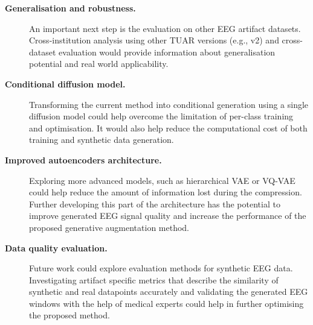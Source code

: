 \begin{description}

\item[\textbf{Generalisation and robustness.}] An important next step is the evaluation on other EEG artifact datasets. Cross-institution analysis using other TUAR versions (e.g., v2) and cross-dataset evaluation would provide information about generalisation potential and real world applicability.

\item[\textbf{Conditional diffusion model.}] Transforming the current method into conditional generation using a single diffusion model could help overcome the limitation of per-class training and optimisation. It would also help reduce the computational cost of both training and synthetic data generation.

\item[\textbf{Improved autoencoders architecture.}] Exploring more advanced models, such as hierarchical VAE or VQ-VAE could help reduce the amount of information lost during the compression. Further developing this part of the architecture has the potential to improve generated EEG signal quality and increase the performance of the proposed generative augmentation method.

\item[\textbf{Data quality evaluation.}] Future work could explore evaluation methods for synthetic EEG data. Investigating artifact specific metrics that describe the similarity of synthetic and real datapoints accurately and validating the generated EEG windows with the help of medical experts could help in further optimising the proposed method.

\end{description}